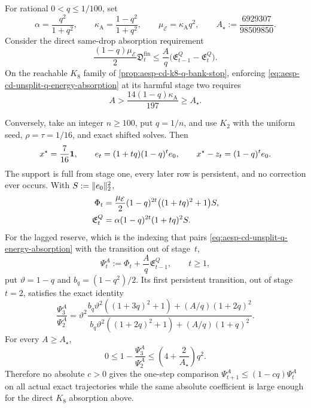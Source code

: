 \begin{proposition}
\label{prop:aesp-cd-unsplit-q-energy-stagewise-stop}
For rational $0<q\leq1/100$, set
\begin{equation*}
 \alpha=\frac{q^2}{1+q^2},
 \qquad
 \kappa_{\mathrm A}=\frac{1-q^2}{1+q^2},
 \qquad
 \mu_{\mathcal E}=\kappa_{\mathrm A}q^2,
 \qquad
 A_\star:=\frac{6929307}{98509850}.
\end{equation*}
Consider the direct same-drop absorption requirement
\begin{equation}
 \frac{(1-q)\mu_{\mathcal E}}2
       \mathfrak D_t^{\mathrm{fin}}
 \leq\frac A q
       \bigl(\mathfrak E_{t-1}^Q-\mathfrak E_t^Q\bigr).
 \label{eq:aesp-cd-unsplit-q-energy-absorption}
\end{equation}
On the reachable $K_8$ family of
\cref{prop:aesp-cd-k8-q-bank-stop}, enforcing
\cref{eq:aesp-cd-unsplit-q-energy-absorption} at its harmful stage two
requires
\begin{equation}
 A>\frac{14(1-q)\kappa_{\mathrm A}}{197}
 \geq A_\star.
 \label{eq:aesp-cd-unsplit-q-energy-floor}
\end{equation}

Conversely, take an integer $n\geq100$, put $q=1/n$, and use $K_2$ with the
uniform seed, $\rho=\tau=1/16$, and exact shifted solves.  Then
\begin{equation*}
 x^\star=\frac7{16}\mathbf{1},
 \qquad
 e_t=(1+tq)(1-q)^te_0,
 \qquad
 x^\star-z_t=(1-q)^te_0.
\end{equation*}
The support is full from stage one, every later row is persistent, and no
correction ever occurs.  With $S:=\lVert e_0\rVert_2^2$,
\begin{align}
 \Phi_t
 &=\frac{\mu_{\mathcal E}}2(1-q)^{2t}
   \bigl((1+tq)^2+1\bigr)S,
 \notag\\
 \mathfrak E_t^Q
 &=\alpha(1-q)^{2t}(1+tq)^2S.
 \label{eq:aesp-cd-k2-low-mode-reserve-data}
\end{align}
For the lagged reserve, which is the indexing that pairs
\cref{eq:aesp-cd-unsplit-q-energy-absorption} with the transition out of
stage~$t$,
\begin{equation*}
 \Psi_t^A:=\Phi_t+\frac A q\mathfrak E_{t-1}^Q,
 \qquad t\geq1,
\end{equation*}
put $\vartheta=1-q$ and $b_q=(1-q^2)/2$.  Its first persistent transition,
out of stage $t=2$, satisfies the exact identity
\begin{equation}
 \frac{\Psi_3^A}{\Psi_2^A}
 =\vartheta^2
   \frac{b_q\vartheta^2((1+3q)^2+1)+(A/q)(1+2q)^2}
        {b_q\vartheta^2((1+2q)^2+1)+(A/q)(1+q)^2}.
 \label{eq:aesp-cd-k2-low-mode-reserve-ratio}
\end{equation}
For every $A\geq A_\star$,
\begin{equation}
 0\leq1-\frac{\Psi_3^A}{\Psi_2^A}
 \leq\left(4+\frac2{A_\star}\right)q^2.
 \label{eq:aesp-cd-k2-low-mode-q2-stop}
\end{equation}
Therefore no absolute $c>0$ gives the one-step comparison
$\Psi_{t+1}^A\leq(1-cq)\Psi_t^A$ on all actual exact trajectories while the
same absolute coefficient is large enough for the direct $K_8$ absorption
above.


\end{proposition}

